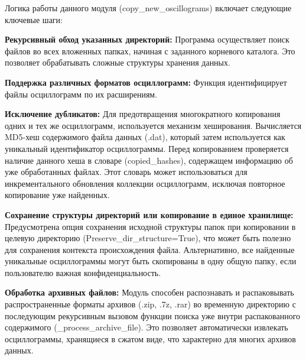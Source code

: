 Логика работы данного модуля (copy\_new\_oscillograms) включает следующие ключевые шаги:\par\vspace{0.2cm}

\textbf{Рекурсивный обход указанных директорий:} Программа осуществляет поиск файлов во всех вложенных папках, начиная с заданного корневого каталога. Это позволяет обрабатывать сложные структуры хранения данных.\par\vspace{0.2cm}

\textbf{Поддержка различных форматов осциллограмм:} Функция идентифицирует файлы осциллограмм по их расширениям.\par\vspace{0.2cm}

\textbf{Исключение дубликатов:} Для предотвращения многократного копирования одних и тех же осциллограмм, используется механизм хеширования. Вычисляется MD5-хеш содержимого файла данных (.dat), который затем используется как уникальный идентификатор осциллограммы. Перед копированием проверяется наличие данного хеша в словаре (copied\_hashes), содержащем информацию об уже обработанных файлах. Этот словарь может использоваться для инкрементального обновления коллекции осциллограмм, исключая повторное копирование уже найденных.\par\vspace{0.2cm}

\textbf{Сохранение структуры директорий или копирование в единое хранилище:} Предусмотрена опция сохранения исходной структуры папок при копировании в целевую директорию (Preserve\_dir\_structure=True), что может быть полезно для сохранения контекста происхождения файла. Альтернативно, все найденные уникальные осциллограммы могут быть скопированы в одну общую папку, если пользователю важная конфиденциальность.\par\vspace{0.2cm}

\textbf{Обработка архивных файлов:} Модуль способен распознавать и распаковывать распространенные форматы архивов (.zip, .7z, .rar) во временную директорию с последующим рекурсивным вызовом функции поиска уже внутри распакованного содержимого (\_process\_archive\_file). Это позволяет автоматически извлекать осциллограммы, хранящиеся в сжатом виде, что характерно для многих архивов данных.\par\vspace{0.2cm}

